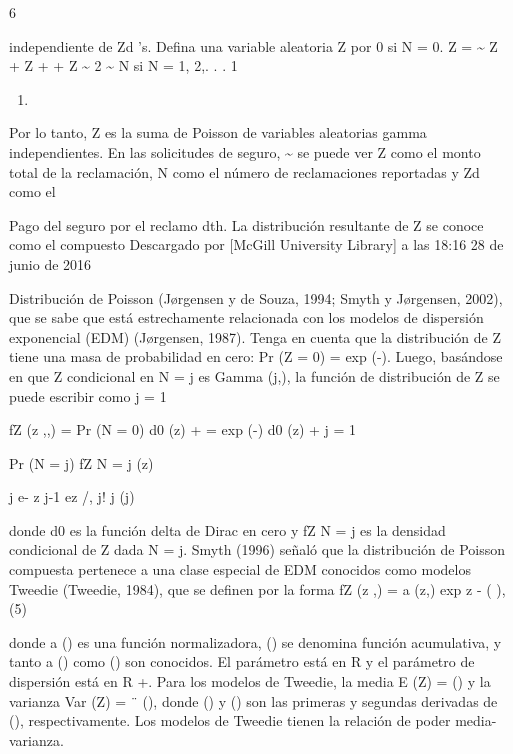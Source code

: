\documentclass[]{article}
\providecommand{\tightlist}{%
  \setlength{\itemsep}{0pt}\setlength{\parskip}{0pt}}
\begin{document}
6

\begin{description}
\tightlist
\item[]
independiente de Zd 's. Defina una variable aleatoria Z por 0 si N = 0.
Z = \textasciitilde{} Z + Z + + Z \textasciitilde{} 2 \textasciitilde{}
N si N = 1, 2,. . . 1
\end{description}

\begin{enumerate}
\def\labelenumi{(\arabic{enumi})}
\setcounter{enumi}{3}
\item
\end{enumerate}

Por lo tanto, Z es la suma de Poisson de variables aleatorias gamma
independientes. En las solicitudes de seguro, \textasciitilde{} se puede
ver Z como el monto total de la reclamación, N como el número de
reclamaciones reportadas y Zd como el

Pago del seguro por el reclamo dth. La distribución resultante de Z se
conoce como el compuesto Descargado por {[}McGill University Library{]}
a las 18:16 28 de junio de 2016

Distribución de Poisson (Jørgensen y de Souza, 1994; Smyth y Jørgensen,
2002), que se sabe que está estrechamente relacionada con los modelos de
dispersión exponencial (EDM) (Jørgensen, 1987). Tenga en cuenta que la
distribución de Z tiene una masa de probabilidad en cero: Pr (Z = 0) =
exp (-). Luego, basándose en que Z condicional en N = j es Gamma (j,),
la función de distribución de Z se puede escribir como j = 1

fZ (z \textbar{},,) = Pr (N = 0) d0 (z) + = exp (-) d0 (z) + j = 1

Pr (N = j) fZ \textbar{} N = j (z)

j e- z j-1 ez /, j! j (j)

donde d0 es la función delta de Dirac en cero y fZ \textbar{} N = j es
la densidad condicional de Z dada N = j. Smyth (1996) señaló que la
distribución de Poisson compuesta pertenece a una clase especial de EDM
conocidos como modelos Tweedie (Tweedie, 1984), que se definen por la
forma fZ (z \textbar{},) = a (z,) exp z - ( ), (5)

donde a () es una función normalizadora, () se denomina función
acumulativa, y tanto a () como () son conocidos. El parámetro está en R
y el parámetro de dispersión está en R +. Para los modelos de Tweedie,
la media E (Z) = () y la varianza Var (Z) = ¨ (), donde () y () son las
primeras y segundas derivadas de (), respectivamente. Los modelos de
Tweedie tienen la relación de poder media-varianza.
\end{document}
